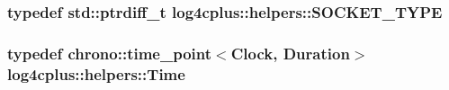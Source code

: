 \hypertarget{namespacelog4cplus_1_1helpers_afe2a1567866b6a9e0bfd5d425c3323f2}{
\subsubsection[{S\-O\-C\-K\-E\-T\-\_\-\-T\-Y\-P\-E}]{\setlength{\rightskip}{0pt plus 5cm}typedef std\-::ptrdiff\-\_\-t {\bf log4cplus\-::helpers\-::\-S\-O\-C\-K\-E\-T\-\_\-\-T\-Y\-P\-E}}}\label{namespacelog4cplus_1_1helpers_afe2a1567866b6a9e0bfd5d425c3323f2}
\hypertarget{namespacelog4cplus_1_1helpers_af05d40c37e1cccf9d11d0cbb7426bcd4}{
\subsubsection[{Time}]{\setlength{\rightskip}{0pt plus 5cm}typedef chrono\-::time\-\_\-point$<${\bf Clock}, {\bf Duration}$>$ {\bf log4cplus\-::helpers\-::\-Time}}}\label{namespacelog4cplus_1_1helpers_af05d40c37e1cccf9d11d0cbb7426bcd4}



